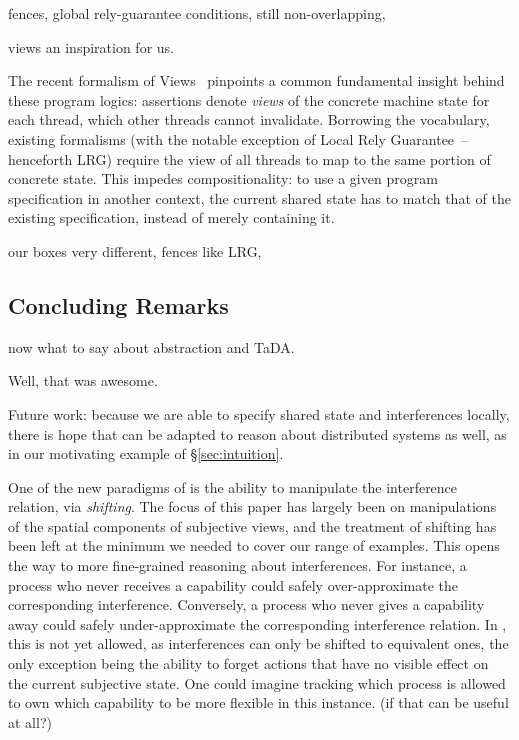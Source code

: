 fences, global rely-guarantee conditions,  still non-overlapping, 



views an inspiration for us. 


The recent formalism of Views~\cite{views} pinpoints a common
fundamental insight behind these program logics: assertions denote
\emph{views} of the concrete machine state for each thread, which
other threads cannot invalidate. Borrowing the vocabulary, existing
formalisms (with the notable exception of Local Rely
Guarantee~\cite{lrg}--henceforth LRG) require the view of all threads
to map to the same portion of concrete state. This impedes
compositionality: to use a given program specification in another
context, the current shared state has to match that of the existing
specification, instead of merely containing it. 

our boxes very different,  fences like LRG, 

\subsection*{Concluding Remarks}
\label{sec:conclusion}

now what to say about
abstraction and TaDA. 

Well, that was awesome.

Future work: because we are able to specify shared state and
interferences locally, there is hope that \colosl can be adapted to
reason about distributed systems as well, as in our motivating example
of \S\ref{sec:intuition}.


One of the new paradigms of \colosl is the ability to manipulate the
interference relation, via \emph{shifting}. The focus of this paper
has largely been on manipulations of the spatial components of
subjective views, and the treatment of shifting has been left at the
minimum we needed to cover our range of examples. This opens the way
to more fine-grained reasoning about interferences. For instance, a
process who never receives a capability could safely over-approximate
the corresponding interference. Conversely, a process who never gives
a capability away could safely under-approximate the corresponding
interference relation. In \colosl, this is not yet allowed, as
interferences can only be shifted to equivalent ones, the only
exception being the ability to forget actions that have no visible
effect on the current subjective state. One could imagine tracking
which process is allowed to own which capability to be more flexible
in this instance. (if that can be useful at all?)
